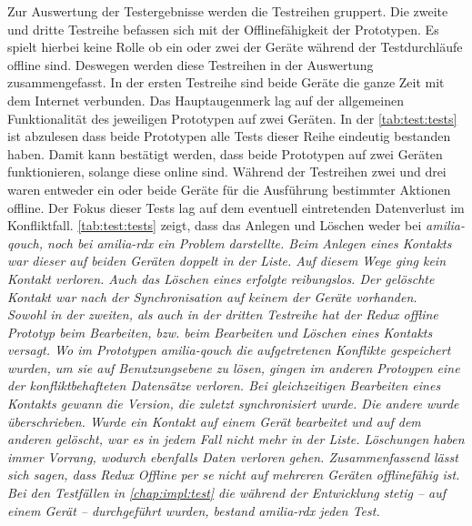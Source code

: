 Zur Auswertung der Testergebnisse werden die Testreihen gruppert.
Die zweite und dritte Testreihe befassen sich mit der Offlinefähigkeit der Prototypen.
Es spielt hierbei keine Rolle ob ein oder zwei der Geräte während der Testdurchläufe offline sind. Deswegen werden diese Testreihen in der Auswertung zusammengefasst.
%
%
%
In der ersten Testreihe sind beide Geräte die ganze Zeit mit dem Internet verbunden.
Das Hauptaugenmerk lag auf der allgemeinen Funktionalität des jeweiligen Prototypen auf zwei Geräten.
In der \autoref{tab:test:tests} ist abzulesen dass beide Prototypen alle Tests dieser Reihe eindeutig bestanden haben.
Damit kann bestätigt werden, dass beide Prototypen auf zwei Geräten funktionieren, solange diese online sind.
%
%
%
Während der Testreihen zwei und drei waren entweder ein oder beide Geräte für die Ausführung bestimmter Aktionen offline.
Der Fokus dieser Tests lag auf dem eventuell eintretenden Datenverlust im Konfliktfall.
\autoref{tab:test:tests} zeigt, dass das Anlegen und Löschen weder bei \it{amilia-qouch}, noch bei \it{amilia-rdx} ein Problem darstellte.
Beim Anlegen eines Kontakts war dieser auf beiden Geräten doppelt in der Liste. Auf diesem Wege ging kein Kontakt verloren.
Auch das Löschen eines erfolgte reibungslos. Der gelöschte Kontakt war nach der Synchronisation auf keinem der Geräte vorhanden.\\
Sowohl in der zweiten, als auch in der dritten Testreihe hat der Redux offline Prototyp beim Bearbeiten, bzw. beim Bearbeiten und Löschen eines Kontakts versagt.
Wo im Prototypen \it{amilia-qouch} die aufgetretenen Konflikte gespeichert wurden, um sie auf Benutzungsebene zu lösen, gingen im anderen Protoypen eine der konfliktbehafteten Datensätze verloren.
Bei gleichzeitigen Bearbeiten eines Kontakts gewann die Version, die zuletzt synchronisiert wurde. Die andere wurde überschrieben.
Wurde ein Kontakt auf einem Gerät bearbeitet und auf dem anderen gelöscht, war es in jedem Fall nicht mehr in der Liste. Löschungen haben immer Vorrang, wodurch ebenfalls Daten verloren gehen.
% 
%
Zusammenfassend lässt sich sagen, dass Redux Offline per se nicht auf mehreren Geräten offlinefähig ist.
Bei den Testfällen in \autoref{chap:impl:test} die während der Entwicklung stetig -- auf einem Gerät -- durchgeführt wurden, bestand \it{amilia-rdx} jeden Test.
